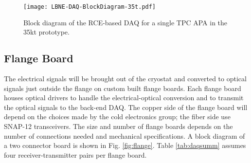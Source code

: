 


\begin{figure}[p]
\texttt{[image: LBNE-DAQ-BlockDiagram-35t.pdf]}
\caption{Block diagram of the RCE-based DAQ for a single TPC APA in the 35kt prototype.}
\label{fig:blockDiag}
\end{figure} 

\subsection{Flange Board}

The electrical signals will be brought out of the cryostat and converted to optical signals just outside the flange on custom built flange boards.   Each flange board houses optical drivers to handle the electrical-optical conversion and to transmit the optical signals to the  back-end DAQ.  The copper side of the flange board will depend on the choices made by the cold electronics group; the fiber side use SNAP-12 transceivers.  The size and number of flange boards depends on the number of connections needed and mechanical specifications.  A block diagram of a two connector board is shown in Fig. \ref{fig:flange}.  Table \ref{tab:daqsumm} assumes four receiver-transmitter pairs per flange board.  

